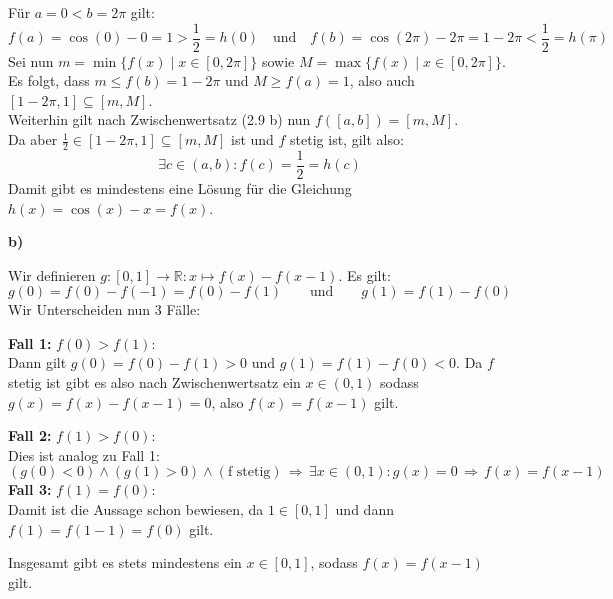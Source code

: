 \documentclass[a4paper,graphics,11pt]{article}
\begin{document}
Für $a = 0 < b = 2\pi$ gilt:
$$
    f(a) = \cos(0)-0 = 1 > \frac{1}{2} = h(0)
    \quad\text{und}\quad
    f(b) = \cos(2\pi)-2\pi = 1 -2\pi < \frac{1}{2} = h(\pi)
$$
Sei nun $m = \min\{f(x) \mid x\in[0, 2\pi]\}$ sowie
$M = \max\{f(x)\mid x\in[0,2\pi]\}$.\\[2pt]
Es folgt, dass $m \leq f(b) = 1-2\pi$ und $M \geq f(a) = 1$, also auch
$[1-2\pi, 1] \subseteq [m,M]$.\\[2pt]
Weiterhin gilt nach Zwischenwertsatz (2.9 b) nun $f([a,b]) = [m,M]$.\\[2pt]
Da aber $\frac{1}{2} \in [1-2\pi, 1] \subseteq [m,M]$ ist und $f$ stetig ist, gilt also:
$$
    \exists c \in (a,b) \colon f(c) = \frac{1}{2} = h(c)
$$
Damit gibt es mindestens eine Lösung für die Gleichung $h(x) = \cos(x)-x = f(x)$.


\textbf{b)}

Wir definieren $g\colon [0,1] \to \mathbb{R}\colon x \mapsto f(x) -f(x-1)$.
Es gilt:
$$
    g(0) = f(0)-f(-1) = f(0)-f(1)
    \qquad\text{und}\qquad
    g(1) = f(1)-f(0)
$$
Wir Unterscheiden nun 3 Fälle:

\textbf{Fall 1:} $f(0) > f(1)\colon$\\
Dann gilt $g(0) = f(0) - f(1) > 0$ und $g(1) = f(1) - f(0) <0 $. Da $f$ stetig ist gibt
es also nach Zwischenwertsatz ein $x \in (0,1)$ sodass $g(x) = f(x) - f(x-1) = 0$, also $f(x) = f(x-1)$ gilt.

\textbf{Fall 2:} $f(1) > f(0)\colon$\\
Dies ist analog zu Fall 1:
$$
    (g(0) < 0) \land (g(1) > 0)\land(\text{f stetig}) \,\Longrightarrow\, \exists x \in (0,1)\colon g(x) = 0
    \,\Longrightarrow\, f(x) = f(x-1)
$$
\textbf{Fall 3:} $f(1) = f(0)\colon$\\
Damit ist die Aussage schon bewiesen, da $1 \in [0,1]$ und dann $f(1) = f(1-1) = f(0)$ gilt.

Insgesamt gibt es stets mindestens ein $x \in [0,1]$, sodass $f(x) = f(x-1)$ gilt.
\end{document}
